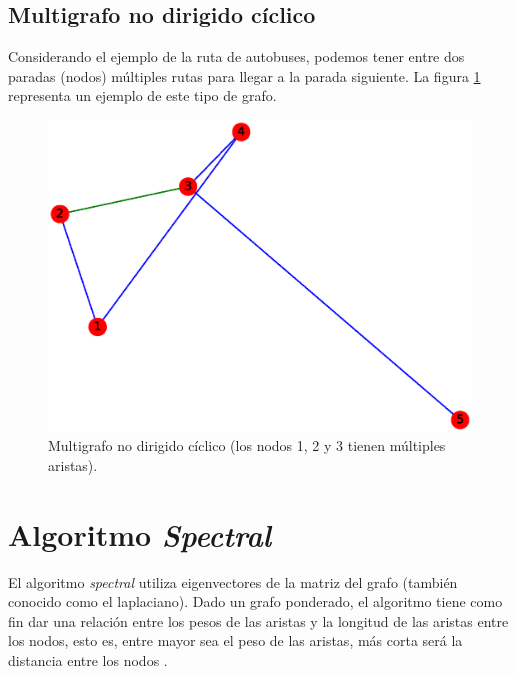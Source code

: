 \documentclass{article}
\begin{document}
\subsection{Multigrafo no dirigido cíclico}
Considerando el ejemplo de la ruta de autobuses, podemos tener entre dos paradas (nodos) múltiples rutas para llegar a la parada siguiente. La figura \ref{fig:MNDC} representa un ejemplo de este tipo de grafo.
\begin{figure}[H]
    \includegraphics[width=\textwidth]{8-MNDC}
    \caption{Multigrafo no dirigido cíclico (los nodos 1, 2 y 3 tienen múltiples aristas).}
    \label{fig:MNDC}
\end{figure}

\section{Algoritmo \textit{Spectral}}
El algoritmo \textit{spectral} utiliza eigenvectores de la matriz del grafo (también conocido como el laplaciano). Dado un grafo ponderado, el algoritmo tiene como fin dar una relación entre los pesos de las aristas y la longitud de las aristas entre los nodos, esto es, entre mayor sea el peso de las aristas, más corta será la distancia entre los nodos \cite{spectral}.
\end{document}

